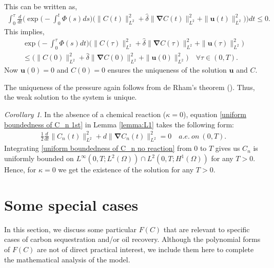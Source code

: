 \documentclass[final,3p,times]{elsarticle}
\theoremstyle{plain}
\theoremstyle{remark}
\newtheorem{corollary}{Corollary}
\theoremstyle{plain}
\theoremstyle{remark}
\begin{document}
This can be written as,
\begin{align}
  \int_0^\tau \frac{d}{dt} 
     \Big(  \exp{\Big(-\int_0^t \Phi\left(s\right)ds\Big)} \Big(\|C\left(t\right)\|^2_{L^2} + \hat \delta\|\boldsymbol{\nabla} C\left(t\right)\|^2_{L^2} +\|\mathbf u\left(t\right)\|_{L^2}^2  \Big) \Big) dt \le 0.
\end{align}
This implies,
\begin{align}
     \exp{\Big(-\int_0^\tau \Phi\left(s\right)dt\Big)} \Big(\|C\left(\tau\right)\|^2_{L^2} + \hat \delta\|\boldsymbol{\nabla} C\left(\tau\right)\|^2_{L^2} +\|\mathbf u\left(\tau\right)\|_{L^2}^2  \Big) \nonumber\\ \le \Big(\|C\left(0\right)\|^2_{L^2} + \hat \delta\|\boldsymbol{\nabla} C\left(0\right)\|^2_{L^2} +\|\mathbf u\left(0\right)\|_{L^2}^2  \Big) \quad \forall \tau \in \left(0,T\right).
\end{align}
Now $\mathbf u\left(0\right)=0$ and $C\left(0\right)=0$ ensures the uniqueness of the solution $\mathbf u$ and $C$.

The uniqueness of the pressure again follows from de Rham's theorem (\emph{\citep[Theorem IV.2.4]{boyer2012mathematical}}). Thus, the weak solution to the system is unique.

\begin{corollary}
    In the absence of a chemical reaction ($\kappa = 0$), equation \eqref{uniform boundedness of C_n 1st} in Lemma \ref{lemma:L1} takes the following form:
\begin{align}
    \frac{1}{2}\frac{d}{dt}\|C_n\left(t\right)\|_{L^2}^2+d\|\boldsymbol{\nabla}{C_n\left(t\right)}\|^2_{L^2}=0 \quad a.e. \ on \ (0,T). \label{uniform boundedness of C_n no reaction}
\end{align}
Integrating \eqref{uniform boundedness of C_n no reaction} from $0$ to $T$ gives us 
$C_n$ is uniformly bounded on $L^\infty(0,T;L^2(\Omega))\cap L^2(0,T;H^1(\Omega))$ for any $T>0$. Hence, for $\kappa=0$ we get the existence of the solution for any $T>0$. 
\end{corollary}

\section{Some special cases} \label{sec:special_cases}

In this section, we discuss some particular $F(C)$ that are relevant to specific cases of carbon sequestration and/or oil recovery. Although the polynomial forms of $F(C)$ are not of direct practical interest, we include them here to complete the mathematical analysis of the model. 
\end{document}

